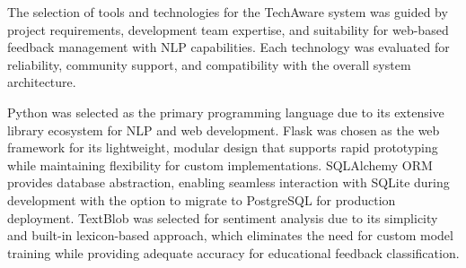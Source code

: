 The selection of tools and technologies for the TechAware system was guided by project requirements, development team expertise, and suitability for web-based feedback management with NLP capabilities. Each technology was evaluated for reliability, community support, and compatibility with the overall system architecture.

Python was selected as the primary programming language due to its extensive library ecosystem for NLP and web development. Flask was chosen as the web framework for its lightweight, modular design that supports rapid prototyping while maintaining flexibility for custom implementations. SQLAlchemy ORM provides database abstraction, enabling seamless interaction with SQLite during development with the option to migrate to PostgreSQL for production deployment. TextBlob was selected for sentiment analysis due to its simplicity and built-in lexicon-based approach, which eliminates the need for custom model training while providing adequate accuracy for educational feedback classification.

